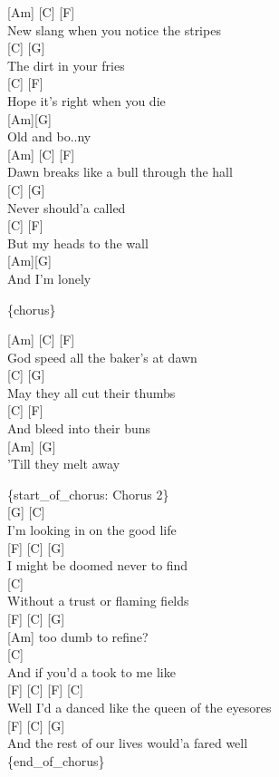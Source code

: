 \documentclass[
  letterpaper,
  DIV=11,
  numbers=noendperiod]{scrreprt}
\begin{document}
{[}Am{]} {[}C{]} {[}F{]}\\
New slang when you notice the stripes\\
{[}C{]} {[}G{]}\\
The dirt in your fries\\
{[}C{]} {[}F{]}\\
Hope it's right when you die\\
{[}Am{]}{[}G{]}\\
Old and bo..ny\\
{[}Am{]} {[}C{]} {[}F{]}\\
Dawn breaks like a bull through the hall\\
{[}C{]} {[}G{]}\\
Never should'a called\\
{[}C{]} {[}F{]}\\
But my heads to the wall\\
{[}Am{]}{[}G{]}\\
And I'm lonely

\{chorus\}

{[}Am{]} {[}C{]} {[}F{]}\\
God speed all the baker's at dawn\\
{[}C{]} {[}G{]}\\
May they all cut their thumbs\\
{[}C{]} {[}F{]}\\
And bleed into their buns\\
{[}Am{]} {[}G{]}\\
'Till they melt away

\{start\_of\_chorus: Chorus 2\}\\
{[}G{]} {[}C{]}\\
I'm looking in on the good life\\
{[}F{]} {[}C{]} {[}G{]}\\
I might be doomed never to find\\
{[}C{]}\\
Without a trust or flaming fields\\
{[}F{]} {[}C{]} {[}G{]}\\
{[}Am{]} too dumb to refine?\\
{[}C{]}\\
And if you'd a took to me like\\
{[}F{]} {[}C{]} {[}F{]} {[}C{]}\\
Well I'd a danced like the queen of the eyesores\\
{[}F{]} {[}C{]} {[}G{]}\\
And the rest of our lives would'a fared well\\
\{end\_of\_chorus\}
\end{document}
